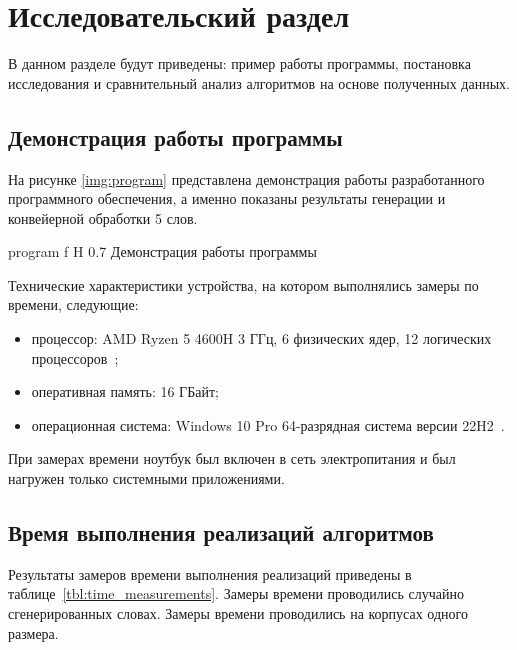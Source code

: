 \chapter{Исследовательский раздел}

В данном разделе будут приведены: пример работы программы, постановка исследования и сравнительный анализ алгоритмов на основе полученных данных.

\section{Демонстрация работы программы}


На рисунке \ref{img:program} представлена демонстрация работы разработанного программного обеспечения, а именно показаны результаты генерации и конвейерной обработки 5 слов.  

{program} %
{f} %
{H} %
{0.7\textwidth} %
{Демонстрация работы программы} %

\clearpage

Технические характеристики устройства, на котором выполнялись замеры по времени, следующие:
\begin{itemize}
	\item процессор: AMD Ryzen 5 4600H 3 ГГц, 6 физических ядер, 12 логических процессоров~\cite{amd};
	\item оперативная память: 16 ГБайт;
	\item операционная система: Windows 10 Pro 64-разрядная система версии 22H2~\cite{windows}.
\end{itemize}

При замерах времени ноутбук был включен в сеть электропитания и был нагружен только системными приложениями.

\section{Время выполнения реализаций алгоритмов}

Результаты замеров времени выполнения реализаций приведены в таблице~\ref{tbl:time_measurements}.
Замеры времени проводились случайно сгенерированных словах. Замеры времени проводились на корпусах одного размера.

